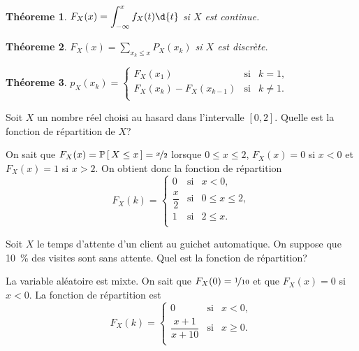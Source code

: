 \documentclass[11pt]{article}
\renewcommand\P[1]{%
	\ensuremath{%
		\mathbb{P}\left[\,#1\,\right]%
	}%
}%
\newtheorem{theoreme}{Théoreme}[section]
\theoremstyle{remark}
\theoremstyle{definition}
\begin{document}
\begin{theoreme}
	$F_X(x)=\displaystyle\int_{-\infty}^xf_X(t)\d{t}$ si $X$ est continue.
\end{theoreme}

\begin{theoreme}\label{th:masse_repartition}
	$F_X(x)=\displaystyle\sum_{x_k\leq x}P_X(x_k)$ si $X$ est discrète.
\end{theoreme}

\begin{theoreme}
	$p_X(x_k)=\left\{
		\begin{matrix}
			F_X(x_1)              & \text{si} & k=1,\\
			F_X(x_k)-F_X(x_{k-1}) & \text{si} & k\neq 1.\\
		\end{matrix}
	\right.$
\end{theoreme}

\begin{exemple}
	Soit $X$ un nombre réel choisi au hasard dans l'intervalle $[0,2]$. Quelle
	est la fonction de répartition de $X$?

	On sait que $F_X(x)=\P{X\leq x}=\nicefrac{x}{2}$ lorsque $0\leq x\leq 2$,
	$F_X(x)=0$ si $x<0$ et $F_X(x)=1$ si $x>2$. On obtient donc la fonction de
	répartition
	\begin{equation*}
		F_X(k)=\left\{
			\begin{matrix}
				0            & \text{si} & x<0,\\
				\dfrac{x}{2} & \text{si} & 0\leq x\leq 2,\\
				1            & \text{si} & 2\leq x.\\
			\end{matrix}
		\right.
	\end{equation*}
\end{exemple}

\pagebreak
\begin{exemple}
	Soit $X$ le temps d'attente d'un client au guichet automatique. On suppose
	que \SI{10}{\percent} des visites sont sans attente. Quel est la fonction
	de répartition?
	
	La variable aléatoire est mixte. On sait que $F_X(0)=\nicefrac{1}{10}$ et
	que $F_X(x)=0$ si $x<0$. La fonction de répartition est
	\begin{equation*}
		F_X(k)=\left\{
			\begin{matrix}
				0                 & \text{si} & x<0,\\
				\dfrac{x+1}{x+10} & \text{si} & x\geq 0.\\
			\end{matrix}
		\right.
	\end{equation*}
\end{exemple}
\end{document}
